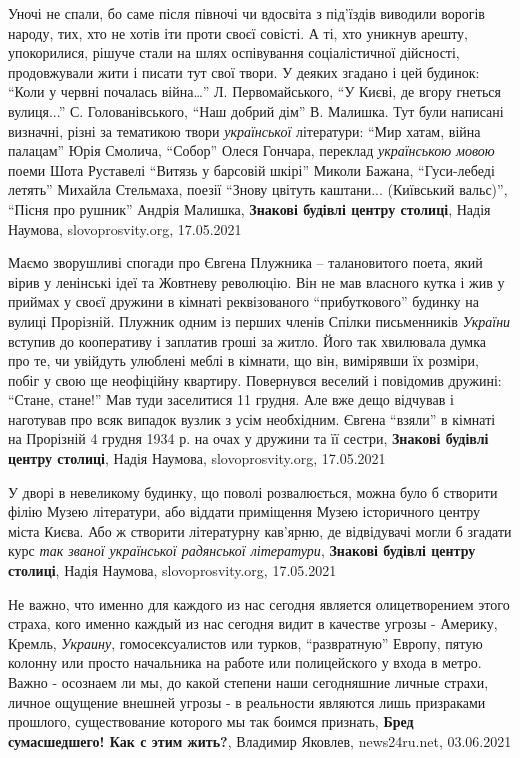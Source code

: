 Уночі не спали, бо саме після півночі чи вдосвіта з під'їздів виводили ворогів
народу, тих, хто не хотів іти проти своєї совісті. А ті, хто уникнув арешту,
упокорилися, рішуче стали на шлях оспівування соціалістичної дійсності,
продовжували жити і писати тут свої твори. У деяких згадано і цей будинок:
\enquote{Коли у червні почалась війна…} Л. Первомайського, \enquote{У Києві, де
вгору гнеться вулиця...} С. Голованівського, \enquote{Наш добрий дім} В.
Малишка.  Тут були написані визначні, різні за тематикою твори \emph{української}
літератури: \enquote{Мир хатам, війна палацам} Юрія Смолича, \enquote{Собор}
Олеся Гончара, переклад \emph{українською мовою} поеми Шота Руставелі \enquote{Витязь
у барсовій шкірі} Миколи Бажана, \enquote{Гуси-лебеді летять} Михайла
Стельмаха, поезії \enquote{Знову цвітуть каштани... (Київський вальс)},
\enquote{Пісня про рушник} Андрія Малишка,
\textbf{Знакові будівлі центру столиці}, Надія Наумова, slovoprosvity.org, 17.05.2021

Маємо зворушливі спогади про Євгена Плужника – талановитого поета, який вірив у
ленінські ідеї та Жовтневу революцію. Він не мав власного кутка і жив у приймах
у своєї дружини в кімнаті реквізованого \enquote{прибуткового} будинку на вулиці
Прорізній. Плужник одним із перших членів Спілки письменників \emph{України} вступив
до кооперативу і заплатив гроші за житло. Його так хвилювала думка про те, чи
увійдуть улюблені меблі в кімнати, що він, вимірявши їх розміри, побіг у свою
ще неофіційну квартиру. Повернувся веселий і повідомив дружині: \enquote{Стане, стане!}
Мав туди заселитися 11 грудня. Але вже дещо відчував і наготував про всяк
випадок вузлик з усім необхідним. Євгена \enquote{взяли} в кімнаті на Прорізній 4
грудня 1934 р. на очах у дружини та її сестри,
\textbf{Знакові будівлі центру столиці}, Надія Наумова, slovoprosvity.org, 17.05.2021

У дворі в невеликому будинку, що поволі розвалюється, можна було б створити
філію Музею літератури, або віддати приміщення Музею історичного центру міста
Києва. Або ж створити літературну кав'ярню, де відвідувачі могли б згадати курс
\emph{так званої української радянської літератури},
\textbf{Знакові будівлі центру столиці}, Надія Наумова, slovoprosvity.org, 17.05.2021

Не важно, что именно для каждого из нас сегодня является олицетворением этого
страха, кого именно каждый из нас сегодня видит в качестве угрозы - Америку,
Кремль, \emph{Украину}, гомосексуалистов или турков, \enquote{развратную} Европу,
пятую колонну или просто начальника на работе или полицейского у входа в метро.
Важно - осознаем ли мы, до какой степени наши сегодняшние личные страхи, личное
ощущение внешней угрозы - в реальности являются лишь призраками прошлого,
существование которого мы так боимся признать,
\textbf{Бред сумасшедшего! Как с этим жить?}, Владимир Яковлев, news24ru.net, 03.06.2021

